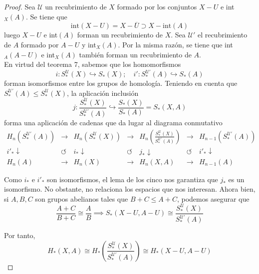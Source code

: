\begin{proof}
Sea $\mathcal{U}$ un recubrimiento de $X$ formado por los conjuntos $X-U$ e int$_X(A)$. Se tiene que $$\mbox{int}(X-U)=X-\overline{U} \supset X-\mbox{int}(A)$$ luego $X-U$ e int$(A)$ forman un recubrimiento de $X$. Sea $\mathcal{U}'$ el recubrimiento de $A$ formado por $A-U$ y int$_X(A)$. Por la misma razón, se tiene que int$_A(A-U)$ e int$_X(A)$ también forman un recubrimiento de $A$.
\\

En virtud del teorema 7, sabemos que los homomorfismos $$i: S_*^\mathcal{U}(X) \hookrightarrow S_*(X);\quad i': S_*^{\mathcal{U}'}(A) \hookrightarrow S_*(A)$$ forman isomorfismos entre los grupos de homología. Teniendo en cuenta que $S_*^{\mathcal{U}'}(A) \leq S_*^\mathcal{U}(X)$, la aplicación inclusión $$j: \frac{S_*^\mathcal{U}(X)}{S_*^{\mathcal{U}'}(A)} \hookrightarrow \frac{S_*(X)}{S_*(A)}=S_*(X,A)$$ forma una aplicación de cadenas que da lugar al diagrama conmutativo
\[\begin{array}{ccccccc}
H_n(S_*^{\mathcal{U}'}(A))&\longrightarrow&H_n(S_*^\mathcal{U}(X))&\longrightarrow&H_n\left(\frac{S_*^\mathcal{U}(X)}{S_*^{\mathcal{U}'}(A)}\right)&\longrightarrow&H_{n-1}(S_*^{\mathcal{U}'}(A))\\
i'_*\downarrow&\circlearrowleft&i_*\downarrow&\circlearrowleft&j_*\downarrow&\circlearrowleft&i'_*\downarrow\\
H_n(A)&\longrightarrow&H_n(X)&\longrightarrow&H_n(X,A)&\longrightarrow&H_{n-1}(A)
\end{array}\]

Como $i_*$ e $i'_*$ son isomorfismos, el lema de los cinco nos garantiza que $j_*$ es un isomorfismo. No obstante, no relaciona los espacios que nos interesan. Ahora bien, si $A,B,C$ son grupos abelianos tales que $B+C \leq A+C$, podemos asegurar que $$\frac{A+C}{B+C} \cong \frac{A}{B} \implies S_*(X-U,A-U) \cong \frac{S_*^\mathcal{U}(X)}{S_*^{\mathcal{U}'}(A)}$$

Por tanto,
$$H_*(X,A)\cong H_*\left(\frac{S_*^\mathcal{U}(X)}{S_*^{\mathcal{U}'}(A)}\right) \cong H_*(X-U,A-U)$$
\end{proof}

